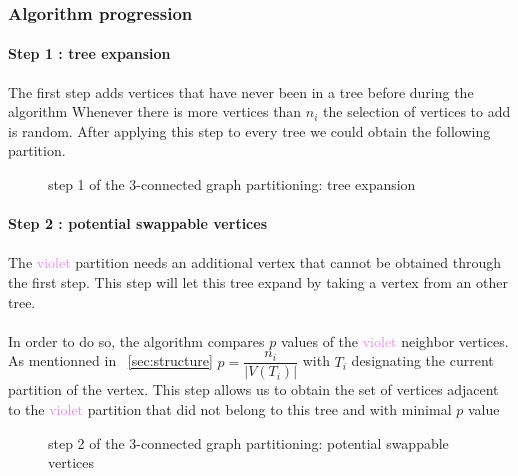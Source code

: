 \subsubsection{Algorithm progression}

\paragraph{Step 1 : tree expansion}
The first step adds vertices that have never been in a tree before during the algorithm
Whenever there is more vertices than $n_i$ the selection of vertices to add is random. 
After applying this step to every tree we could obtain the following partition.

 \begin{figure}[H]
	\begin{center}
	  
	\end{center}
	\caption{step 1 of the 3-connected graph partitioning: tree expansion}
      \end{figure}

\paragraph{Step 2 : potential swappable vertices}
\paragraph{}
The \textcolor{violet}{violet} partition needs an additional vertex that cannot be obtained through the first step. This step will let this tree expand by taking 
a vertex from an other tree.
\paragraph{}
In order to do so, the algorithm compares $p$ values of the \textcolor{violet}{violet} neighbor vertices. As mentionned in ~\ref{sec:structure} $p = \dfrac{n_i}{|V(T_i)|}$ with $T_i$ designating the current partition of the vertex. This step allows us to obtain the set of vertices adjacent to the  \textcolor{violet}{violet} partition that did not belong to this tree and with minimal $p$ value

 \begin{figure}[H]
	\begin{center}
	  
	\end{center}
	\caption{step 2 of the 3-connected graph partitioning: potential swappable vertices}
 \end{figure}
